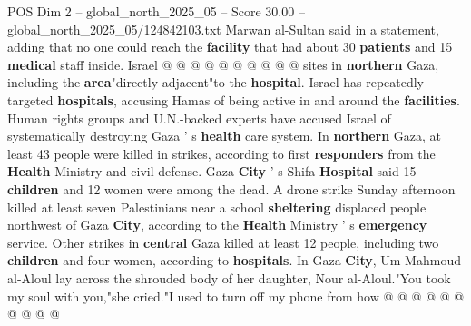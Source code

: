 \begin{textsample}{POS Dim 2 – global\_north\_2025\_05 – Score 30.00 – global\_north\_2025\_05/124842103.txt}
Marwan al-Sultan said in a statement, adding that no one could reach the \textbf{facility} that had about 30 \textbf{patients} and 15 \textbf{medical} staff inside.
Israel @ @ @ @ @ @ @ @ @ @ sites in \textbf{northern} Gaza, including the \textbf{area}"directly adjacent"to the \textbf{hospital}.
Israel has repeatedly targeted \textbf{hospitals}, accusing Hamas of being active in and around the \textbf{facilities}.
Human rights groups and U.N.-backed experts have accused Israel of systematically destroying Gaza ' s \textbf{health} care system.
In \textbf{northern} Gaza, at least 43 people were killed in strikes, according to first \textbf{responders} from the \textbf{Health} Ministry and civil defense.
Gaza \textbf{City} ' s Shifa \textbf{Hospital} said 15 \textbf{children} and 12 women were among the dead.
A drone strike Sunday afternoon killed at least seven Palestinians near a school \textbf{sheltering} displaced people northwest of Gaza \textbf{City}, according to the \textbf{Health} Ministry ' s \textbf{emergency} service.
Other strikes in \textbf{central} Gaza killed at least 12 people, including two \textbf{children} and four women, according to \textbf{hospitals}.
In Gaza \textbf{City}, Um Mahmoud al-Aloul lay across the shrouded body of her daughter, Nour al-Aloul."You took my soul with you,"she cried."I used to turn off my phone from how @ @ @ @ @ @ @ @ @ @

\end{textsample}
